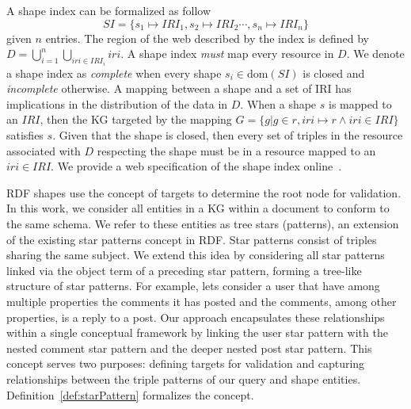 A shape index can be formalized as follow
\begin{equation}\label{eq:shapeIndex}
   SI = \{s_1 \mapsto IRI_1, s_2 \mapsto IRI_2 \cdots, s_n \mapsto IRI_n\}
\end{equation}
given $n$ entries.
The region of the web described by the index is defined by $D = \bigcup_{i=1}^{n} \bigcup_{iri \in IRI_i} iri$.
A shape index \emph{must} map every resource in $D$.
We denote a shape index as \emph{complete} when every shape $s_i \in \text{dom}(SI)$ is closed and \emph{incomplete} otherwise.
A mapping between a shape and a set of IRI has implications in the distribution of the data in $D$.
When a shape $s$ is mapped to an $IRI$, then the KG targeted by the mapping $G = \{g | g \in r, iri \mapsto r \land iri \in IRI\}$ satisfies $s$.
Given that the shape is closed, then every set of triples in the resource associated with $D$ respecting the shape must be in a resource mapped to an $iri \in IRI$.
We provide a web specification of the shape index online~.

RDF shapes use the concept of targets to determine the root node for validation.
In this work, we consider all entities in a KG within a document to conform to the same schema.
We refer to these entities as tree stars (patterns), an extension of the existing star patterns concept in RDF.
Star patterns consist of triples sharing the same subject.
We extend this idea by considering all star patterns linked via the object term of a preceding star pattern, forming a tree-like structure of star patterns.
For example, lets consider a user that have among multiple properties the comments it has posted and the comments, among other properties, is a reply to a post.
Our approach encapsulates these relationships within a single conceptual framework by linking the user star pattern with the nested comment star pattern and the deeper nested post star pattern.
This concept serves two purposes: defining targets for validation and capturing relationships between the triple patterns of our query and shape entities.
Definition~\ref{def:starPattern} formalizes the concept.

